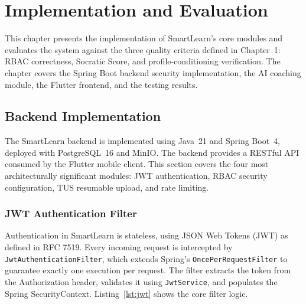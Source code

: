 \documentclass[12pt,a4paper]{report}
\begin{document}
\chapter{Implementation and Evaluation}

This chapter presents the implementation of SmartLearn's core modules and evaluates the
system against the three quality criteria defined in Chapter~1: RBAC correctness, Socratic
Score, and profile-conditioning verification. The chapter covers the Spring Boot backend
security implementation, the AI coaching module, the Flutter frontend, and the testing
results.

\section{Backend Implementation}

The SmartLearn backend is implemented using Java~21 and Spring Boot~4, deployed with
PostgreSQL~16 and MinIO. The backend provides a RESTful API consumed by the Flutter mobile
client. This section covers the four most architecturally significant modules: JWT
authentication, RBAC security configuration, TUS resumable upload, and rate limiting.

\subsection{JWT Authentication Filter}

Authentication in SmartLearn is stateless, using JSON Web Tokens (JWT) as defined in RFC
7519. Every incoming request is intercepted by \texttt{JwtAuthenticationFilter}, which
extends Spring's \texttt{OncePerRequestFilter} to guarantee exactly one execution per
request. The filter extracts the token from the Authorization header, validates it using
\texttt{JwtService}, and populates the Spring SecurityContext. Listing~\ref{lst:jwt} shows
the core filter logic.
\end{document}
